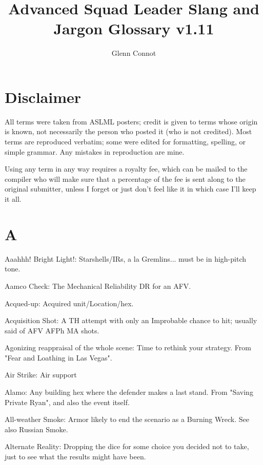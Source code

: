 \documentclass[letterpaper]{article}
\begin{document}
\title{Advanced Squad Leader Slang and Jargon Glossary v1.11}
\author{Glenn Connot}

\maketitle

\newpage

\tableofcontents

\newpage

\section{Disclaimer}

All terms were taken from ASLML posters; credit is given to terms whose origin
is known, not necessarily the person who posted it (who is not credited). Most
terms are reproduced verbatim; some were edited for formatting, spelling, or
simple grammar. Any mistakes in reproduction are mine.

Using any term in any way requires a royalty fee, which can be mailed to the compiler who will make sure that a percentage of the fee is sent along to the original submitter, unless I forget or just don't feel like it in which case I'll keep it all.


\section{A}

Aaahhh!  Bright Light!: Starshells/IRs, a la Gremlins... must be in high-pitch tone.

Aamco Check: The Mechanical Reliability DR for an AFV.

Acqued-up: Acquired unit/Location/hex.

Acquisition Shot: A TH attempt with only an Improbable chance to hit; usually said of AFV AFPh MA shots.

Agonizing reappraisal of the whole scene: Time to rethink your strategy. From "Fear and Loathing in Las Vegas".

Air Strike: Air support

Alamo: Any building hex where the defender makes a last stand. From "Saving Private Ryan", and also the event itself.

All-weather Smoke: Armor likely to end the scenario as a Burning Wreck. See also Russian Smoke.

Alternate Reality: Dropping the dice for some choice you decided not to take, just to see what the results might have been.
\end{document}
